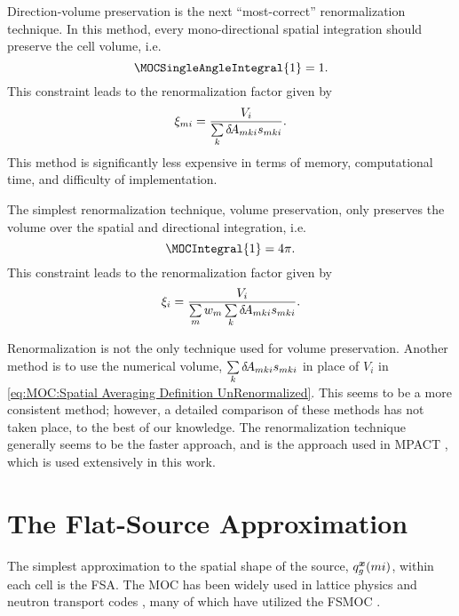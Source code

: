 {{{            Direction-volume preservation is the next ``most-correct'' renormalization technique.
            In this method, every mono-directional spatial integration should preserve the cell volume, i.e.
            \begin{equation}\label{eq:MOC:Angle-Volume Preservation}
                \MOCSingleAngleIntegral{1} = 1.
            \end{equation}
            This constraint leads to the renormalization factor given by
            \begin{equation}\label{eq:MOC:Direction-Dependent Renormalization}
                \renorm[mi] = \frac{V_i}{\suml[k]\tA[mki]\segl}.
            \end{equation}
            This method is significantly less expensive in terms of memory, computational time, and difficulty of implementation.

            The simplest renormalization technique, volume preservation, only preserves the volume over the spatial and directional integration, i.e.
            \begin{equation}\label{eq:MOC:Volume Preservation}
                \MOCIntegral{1} = \fourpi.
            \end{equation}
            This constraint leads to the renormalization factor given by
            \begin{equation}\label{eq:MOC:Region Renormalization}
                \renorm[i] = \frac{V_i}{\suml[m]\wt[m]\suml[k]\tA[mki]\segl}.
            \end{equation}

            Renormalization is not the only technique used for volume preservation.
            Another method is to use the numerical volume, $\suml[k]\tA[mki]\segl$ in place of $V_i$ in \cref{eq:MOC:Spatial Averaging Definition UnRenormalized}.
            This seems to be a more consistent method; however, a detailed comparison of these methods has not taken place, to the best of our knowledge.
            The renormalization technique generally seems to be the faster approach, and is the approach used in MPACT \cite{Collins2016}, which is used extensively in this work.
        }
    }
    \section{The Flat-Source Approximation}{\label{sec:MOC:FSA}
        The simplest approximation to the spatial shape of the source, $\source[mi][g][\loc]$, within each cell is the \acf{FSA}.
        The \ac{MOC} has been widely used in lattice physics and neutron transport codes \cite{Knott2010}, many of which have utilized the \ac{FSMOC} \cite{Halsall1980,Hong1998,Saji2000,Smith2002,Sugimura2006,Masiello2008,Boyd2014,Collins2016}.

}}
